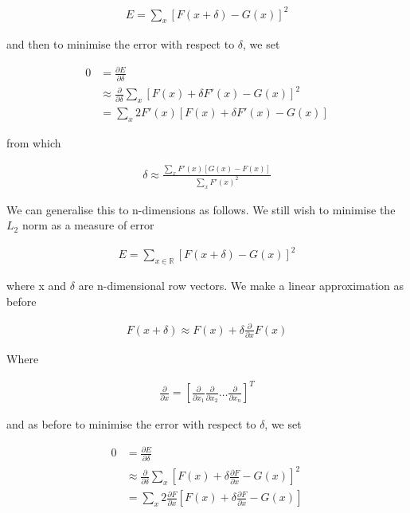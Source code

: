 \begin{align*}
E = \sum_{x}\left[F(x + \delta) - G(x)\right]^2
\end{align*}

and then to minimise the error with respect to $\delta$, we set

\begin{align*}
  0 &= \frac{\partial E}{\partial \delta} \\
  &\approx \frac{\partial}{\partial \delta}\sum_{x}\left[F(x) + \delta F'(x) - G(x)\right]^2 \\
  &= \sum_{x}2F'(x)\left[F(x) + \delta F'(x) - G(x)\right]
\end{align*}

from which

\begin{align*}
  \delta \approx \frac{\sum_{x}F'(x)\left[G(x) - F(x)\right]}{\sum_{x}F'(x)^2}
\end{align*}

We can generalise this to n-dimensions as follows. We still wish to minimise the $L_2$ norm as a measure of error

\begin{align*}
  E = \sum_{x \in \mathbb{R}}\left[F(x + \delta) - G(x)\right]^2
\end{align*}

where x and $\delta$ are n-dimensional row vectors. We make a linear approximation as before

\begin{align*}
  F(x + \delta) \approx F(x) + \delta\frac{\partial}{\partial x}F(x)
\end{align*}

Where

\begin{align*}
  \frac{\partial}{\partial x} = \left[\frac{\partial}{\partial x_1} \frac{\partial}{\partial x_2} \dots \frac{\partial}{\partial x_n}\right]^T
\end{align*}

and as before to minimise the error with respect to $\delta$, we set

\begin{align*}
0 &= \frac{\partial E}{\partial \delta} \\
&\approx \frac{\partial}{\partial \delta}\sum_{x}\left[F(x) + \delta \frac{\partial F}{\partial x} - G(x)\right]^2 \\
&= \sum_{x}2\frac{\partial F}{\partial x}\left[F(x) + \delta \frac{\partial F}{\partial x} - G(x)\right]
\end{align*}

